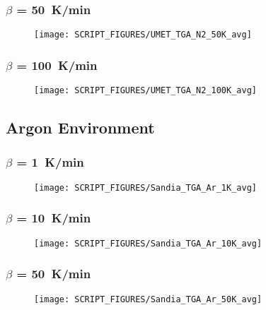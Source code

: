 \begin{landscape}
\newpage
\subsubsection{$\beta$ = 50~K/min}
\begin{minipage}{0.65\textwidth}
\begin{figure}[H]
{\texttt{[image: SCRIPT\_FIGURES/UMET\_TGA\_N2\_50K\_avg]}}\\
\end{figure}
\end{minipage} 

\newpage
\subsubsection{$\beta$ = 100~K/min}
\begin{minipage}{0.65\textwidth}
\begin{figure}[H]
{\texttt{[image: SCRIPT\_FIGURES/UMET\_TGA\_N2\_100K\_avg]}}\\
\end{figure}
\end{minipage} 
\vfill

\subsection{Argon Environment}
\label{TGA_Ar}
\subsubsection{$\beta$ = 1~K/min}
\begin{minipage}{0.65\textwidth}
\begin{figure}[H]
{\texttt{[image: SCRIPT\_FIGURES/Sandia\_TGA\_Ar\_1K\_avg]}}\\
\end{figure}
\end{minipage} 
\vfill

\subsubsection{$\beta$ = 10~K/min}
\begin{minipage}{0.65\textwidth}
\begin{figure}[H]
{\texttt{[image: SCRIPT\_FIGURES/Sandia\_TGA\_Ar\_10K\_avg]}}\\
\end{figure}
\end{minipage} 
\vfill

\subsubsection{$\beta$ = 50~K/min}
\begin{minipage}{0.65\textwidth}
\begin{figure}[H]
{\texttt{[image: SCRIPT\_FIGURES/Sandia\_TGA\_Ar\_50K\_avg]}}\\
\end{figure}
\end{minipage} 
\vfill


\end{landscape}
